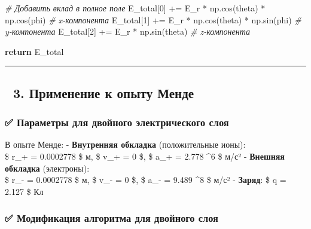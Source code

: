 \documentclass[11pt]{article}
\newenvironment{Shaded}{}{}
\newcommand{\DecValTok}[1]{\textcolor[rgb]{0.25,0.63,0.44}{{#1}}}
\newcommand{\CommentTok}[1]{\textcolor[rgb]{0.38,0.63,0.69}{\textit{{#1}}}}
\newcommand{\NormalTok}[1]{{#1}}
\newcommand{\ControlFlowTok}[1]{\textcolor[rgb]{0.00,0.44,0.13}{\textbf{{#1}}}}
\newcommand{\OperatorTok}[1]{\textcolor[rgb]{0.40,0.40,0.40}{{#1}}}
\begin{document}
\begin{Shaded}
\begin{Highlighting}[]
        \CommentTok{# Добавить вклад в полное поле}
\NormalTok{        E_total[}\DecValTok{0}\NormalTok{] }\OperatorTok{+=}\NormalTok{ E_r }\OperatorTok{*}\NormalTok{ np.cos(theta) }\OperatorTok{*}\NormalTok{ np.cos(phi)  }\CommentTok{# x-компонента}
\NormalTok{        E_total[}\DecValTok{1}\NormalTok{] }\OperatorTok{+=}\NormalTok{ E_r }\OperatorTok{*}\NormalTok{ np.cos(theta) }\OperatorTok{*}\NormalTok{ np.sin(phi)  }\CommentTok{# y-компонента}
\NormalTok{        E_total[}\DecValTok{2}\NormalTok{] }\OperatorTok{+=}\NormalTok{ E_r }\OperatorTok{*}\NormalTok{ np.sin(theta)                }\CommentTok{# z-компонента}

    \ControlFlowTok{return}\NormalTok{ E_total}
\end{Highlighting}
\end{Shaded}

\begin{center}\rule{0.5\linewidth}{\linethickness}\end{center}

\subsection{🔹 3. Применение к опыту
Менде}\label{ux43fux440ux438ux43cux435ux43dux435ux43dux438ux435-ux43a-ux43eux43fux44bux442ux443-ux43cux435ux43dux434ux435}

\subsubsection{✅ Параметры для двойного электрического
слоя}\label{ux43fux430ux440ux430ux43cux435ux442ux440ux44b-ux434ux43bux44f-ux434ux432ux43eux439ux43dux43eux433ux43e-ux44dux43bux435ux43aux442ux440ux438ux447ux435ux441ux43aux43eux433ux43e-ux441ux43bux43eux44f}

В опыте Менде: - \textbf{Внутренняя обкладка} (положительные ионы):\\
\$ r\_+ = 0.0002778 \$ м, \$ v\_+ = 0 \$, \$ a\_+ = 2.778 \^{}6
\$ м/с² - \textbf{Внешняя обкладка} (электроны):\\
\$ r\_- = 0.0002778 \$ м, \$ v\_- = 0 \$, \$ a\_- = 9.489 \^{}8
\$ м/с² - \textbf{Заряд}: \$ q = 2.127 \$ Кл

\subsubsection{✅ Модификация алгоритма для двойного
слоя}\label{ux43cux43eux434ux438ux444ux438ux43aux430ux446ux438ux44f-ux430ux43bux433ux43eux440ux438ux442ux43cux430-ux434ux43bux44f-ux434ux432ux43eux439ux43dux43eux433ux43e-ux441ux43bux43eux44f}
\end{document}
